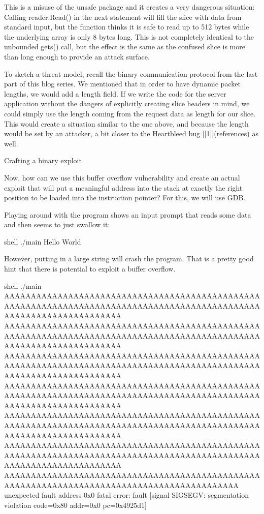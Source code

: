 This is a misuse of the unsafe package and it creates a very dangerous situation: Calling reader.Read() in the next
statement will fill the slice with data from standard input, but the function thinks it is safe to read up to 512 bytes
while the underlying array is only 8 bytes long. This is not completely identical to the unbounded gets() call,
but the effect is the same as the confused slice is more than long enough to provide an attack surface.

To sketch a threat model, recall the binary communication protocol from the last part of this blog series. We mentioned
that in order to have dynamic packet lengths, we would add a length field. If we write the code for the server application
without the dangers of explicitly creating slice headers in mind, we could simply use the length coming from the request
data as length for our slice. This would create a situation similar to the one above, and because the length would be
set by an attacker, a bit closer to the Heartbleed bug [[1]](references) as well.


 Crafting a binary exploit

Now, how can we use this buffer overflow vulnerability and create an actual exploit that will put a meaningful address
into the stack at exactly the right position to be loaded into the instruction pointer? For this, we will use GDB.

Playing around with the program shows an input prompt that reads some data and then seems to just swallow it:

shell
 ./main
Hello World



However, putting in a large string will crash the program. That is a pretty good hint that there is potential to
exploit a buffer overflow.

shell
 ./main
AAAAAAAAAAAAAAAAAAAAAAAAAAAAAAAAAAAAAAAAAAAAAAAAAAAAAAAAAAAAAAAAAAAAAAAAAAAAAAAAAAAAAAAAAAAAAAAAAAAAAAAAAAAAAAAAAAAAAA
AAAAAAAAAAAAAAAAAAAAAAAAAAAAAAAAAAAAAAAAAAAAAAAAAAAAAAAAAAAAAAAAAAAAAAAAAAAAAAAAAAAAAAAAAAAAAAAAAAAAAAAAAAAAAAAAAAAAAA
AAAAAAAAAAAAAAAAAAAAAAAAAAAAAAAAAAAAAAAAAAAAAAAAAAAAAAAAAAAAAAAAAAAAAAAAAAAAAAAAAAAAAAAAAAAAAAAAAAAAAAAAAAAAAAAAAAAAAA
AAAAAAAAAAAAAAAAAAAAAAAAAAAAAAAAAAAAAAAAAAAAAAAAAAAAAAAAAAAAAAAAAAAAAAAAAAAAAAAAAAAAAAAAAAAAAAAAAAAAAAAAAAAAAAAAAAAAAA
AAAAAAAAAAAAAAAAAAAAAAAAAAAAAAAAAAAAAAAAAAAAAAAAAAAAAAAAAAAAAAAAAAAAAAAAAAAAAAAAAAAAAAAAAAAAAAAAAAAAAAAAAAAAAAAAAAAAAA
AAAAAAAAAAAAAAAAAAAAAAAAAAAAAAAAAAAAAAAAAAAAAAAAAAAAAAAAAAAAAAAAAAAAAAAAAAAAAAAAAAAAAAAAAAAAAAAAAAAAAAAAAAAAAAAAAAAAAA
AAAAAAAAAAAAAAAAAAAAAAAAAAAAAAAAAAAAAAAAAAAAAAAAAAAAAAAAAAAAAAAAAAAAAAAAAAAAAAAAAAAAAAAAAAAA
unexpected fault address 0x0
fatal error: fault
[signal SIGSEGV: segmentation violation code=0x80 addr=0x0 pc=0x4925d1]

